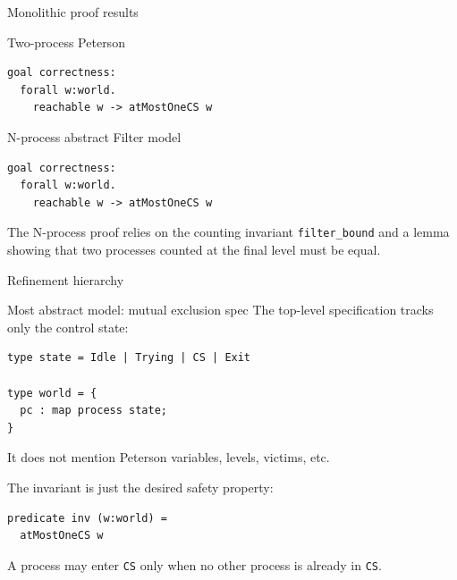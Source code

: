 \documentclass[aspectratio=169,10pt]{beamer}
\begin{document}
\begin{frame}[fragile]{Monolithic proof results}
\begin{block}{Two-process Peterson}
\begin{lstlisting}[language=why3]
goal correctness:
  forall w:world.
    reachable w -> atMostOneCS w
\end{lstlisting}
\end{block}

\begin{block}{N-process abstract Filter model}
\begin{lstlisting}[language=why3]
goal correctness:
  forall w:world.
    reachable w -> atMostOneCS w
\end{lstlisting}
\end{block}

\vspace{0.25cm}
The N-process proof relies on the counting invariant \texttt{filter\_bound} and a lemma showing that two processes counted at the final level must be equal.
\end{frame}

\begin{frame}{Refinement hierarchy}
\begin{center}
\end{center}
\end{frame}

\begin{frame}[fragile]{Most abstract model: mutual exclusion spec}
The top-level specification tracks only the control state:

\begin{lstlisting}[language=why3]
type state = Idle | Trying | CS | Exit

type world = {
  pc : map process state;
}
\end{lstlisting}

\vspace{0.2cm}
It does not mention Peterson variables, levels, victims, etc.

\vspace{0.2cm}
The invariant is just the desired safety property:
\begin{lstlisting}[language=why3]
predicate inv (w:world) =
  atMostOneCS w
\end{lstlisting}

\vspace{0.2cm}
A process may enter \texttt{CS} only when no other process is already in \texttt{CS}.
\end{frame}
\end{document}

